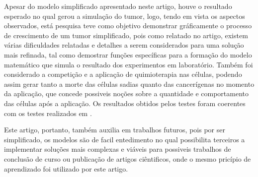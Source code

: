 \documentclass[12pt]{article}
\begin{document}
Apesar do modelo simplificado apresentado neste artigo, houve o resultado esperado no qual gerou a simulação do tumor, logo, tendo em vista os aspectos observados, está pesquisa teve como objetivo demonstrar gráficamente o processo de crescimento de um tumor simplificado, pois como relatado no artigo, existem várias dificuldades relatadas e detalhes a serem considerados para uma solução mais refinada, tal como demostrar funções específicas para a formação do modelo matemático que simula o resultado dos experimentos em laboratório. Também foi considerado a competição e a aplicação de quimioterapia nas células, podendo assim gerar tanto a morte das células sadias quanto das cancerígenas no momento da aplicação, que concede possiveis noções sobre a quantidade e comportamento das células após a aplicação. Os resultados obtidos pelos testes foram coerentes com os testes realizados em \cite{Cornil1991}.


Este artigo, portanto, também auxilia em trabalhos futuros, pois por ser simplificado, os modelos são de facil entedimento no qual possibilita terceiros a implementar soluções mais complexas e viáveis para possiveis trabalhos de conclusão de curso ou publicação de artigos ciêntificos, onde o mesmo pricípio de aprendizado foi utilizado por este artigo.


\end{document}
